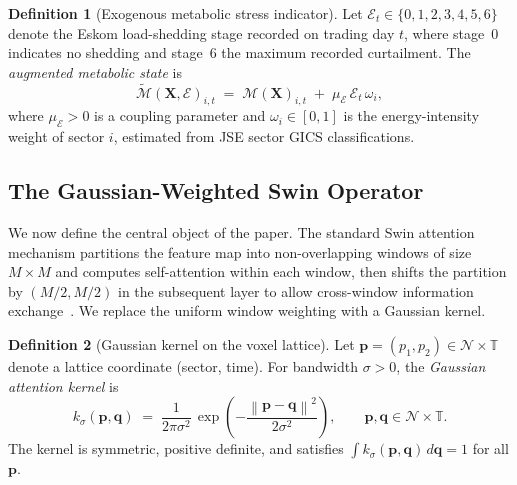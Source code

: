 \documentclass[11pt,a4paper]{article}  %
\newcommand{\Mop}{\mathcal{M}}
\newcommand{\norm}[1]{\left\lVert#1\right\rVert}
\theoremstyle{plain}
\theoremstyle{definition}
\newtheorem{definition}{Definition}[section]
\theoremstyle{remark}
\begin{document}
\begin{definition}[Exogenous metabolic stress indicator]
\label{def:eskom}
Let $\mathcal{E}_t \in \{0,1,2,3,4,5,6\}$ denote the Eskom
load-shedding stage recorded on trading day $t$, where stage~0
indicates no shedding and stage~6 the maximum recorded curtailment.
The \emph{augmented metabolic state} is
\[
   \widetilde{\Mop}(\mathbf{X},\mathcal{E})_{i,t}
   \;=\; \Mop(\mathbf{X})_{i,t}
   \;+\; \mu_{\mathcal{E}}\,\mathcal{E}_t\,\omega_{i},
\]
where $\mu_{\mathcal{E}}>0$ is a coupling parameter and
$\omega_i \in [0,1]$ is the energy-intensity weight of sector
$i$, estimated from JSE sector GICS classifications.
\end{definition}

\subsection{The Gaussian-Weighted Swin Operator}
\label{subsec:gwsop}

We now define the central object of the paper. The standard Swin
attention mechanism partitions the feature map into non-overlapping
windows of size $M\times M$ and computes self-attention within each
window, then shifts the partition by $(M/2,M/2)$ in the subsequent
layer to allow cross-window information exchange~\cite{Liu2021}.
We replace the uniform window weighting with a Gaussian kernel.

\begin{definition}[Gaussian kernel on the voxel lattice]
\label{def:gausskernel}
Let $\mathbf{p} = (p_1,p_2)\in\mathcal{N}\times\mathbb{T}$ denote
a lattice coordinate (sector, time). For bandwidth $\sigma > 0$,
the \emph{Gaussian attention kernel} is
\[
   k_\sigma(\mathbf{p},\mathbf{q})
   \;=\; \frac{1}{2\pi\sigma^2}\,
   \exp\!\left(-\frac{\norm{\mathbf{p}-\mathbf{q}}^2}{2\sigma^2}\right),
   \qquad \mathbf{p},\mathbf{q}\in\mathcal{N}\times\mathbb{T}.
\]
The kernel is symmetric, positive definite, and satisfies
$\int k_\sigma(\mathbf{p},\mathbf{q})\,d\mathbf{q} = 1$ for all
$\mathbf{p}$.
\end{definition}
\end{document}

